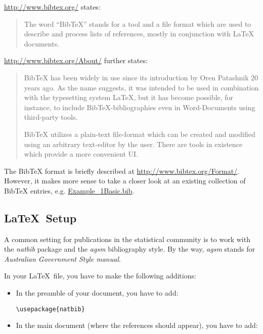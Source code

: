 \documentclass[12pt]{article}
\begin{document}
\url{http://www.bibtex.org/} states:
\begin{quotation}
The word ``BibTeX'' stands for a tool and a file format which are used to describe and process lists of references, mostly in conjunction with LaTeX documents.
\end{quotation}


\noindent
\url{http://www.bibtex.org/About/} further states:
\begin{quotation}
BibTeX has been widely in use since its introduction by Oren Patashnik 20 years ago. As the name suggests, it was intended to be used in combination with the typesetting system LaTeX, but it has become possible, for instance, to include BibTeX-bibliographies even in Word-Documents using third-party tools.

BibTeX utilizes a plain-text file-format which can be created and modified using an arbitrary text-editor by the user. There are tools in existence which provide a more convenient UI.
\end{quotation}

The BibTeX format is briefly described at \url{http://www.bibtex.org/Format/}.
However, it makes more sense to take a closer look at an existing
collection of BibTeX entries, e.g.
\url{Example_1Basic.bib}.


\subsection{\LaTeX\ Setup}

A common setting for publications in the statistical community is to work
with the {\it natbib} package and the {\it agsm} bibliography style.
By the way, {\it agsm} stands for {\it Australian Government Style manual}.
 
In your \LaTeX\ file, you have to make the following additions:
\begin{itemize}

\item In the preamble of your document, you have to add:
\begin{verbatim}
\usepackage{natbib}
\end{verbatim}

\item In the main document (where the references should appear), you have to add:
\begin{verbatim}


\end{verbatim}
\end{itemize}
\end{document}
